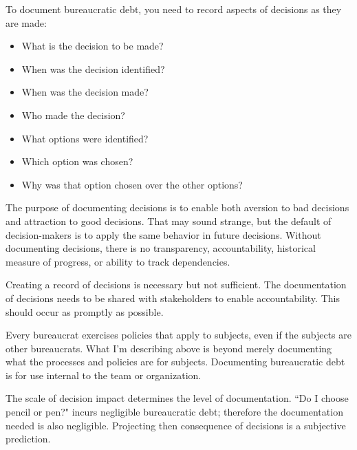 To document bureaucratic debt, you need to record aspects of decisions as they are made:
\begin{itemize}
    \item What is the decision to be made?
    \item When was the decision  identified?
    \item When was the decision made?
    \item Who made the decision?
    \item What options were identified?
    \item Which option was chosen?
    \item Why was that option  chosen over the other options?
\end{itemize}
The purpose of documenting decisions is to enable both aversion to bad decisions and attraction to good decisions. That may sound strange, but the default of decision-makers is to apply the same behavior in future decisions. 
Without documenting decisions, there is no transparency, accountability, historical measure of progress, or ability to track dependencies. 

Creating a record of decisions is necessary but not sufficient. The documentation of decisions needs to be shared with stakeholders to enable accountability. This should occur as promptly as possible. 

Every bureaucrat exercises policies that apply to subjects, even if the subjects are other bureaucrats. What I'm describing above is beyond merely documenting what the processes and policies are for subjects. Documenting bureaucratic debt is for use internal to the team or organization.  

The scale of decision impact determines the level of documentation. ``Do I choose pencil or pen?" incurs negligible bureaucratic debt; therefore the documentation needed is also negligible. Projecting then consequence of decisions is a subjective prediction. 


